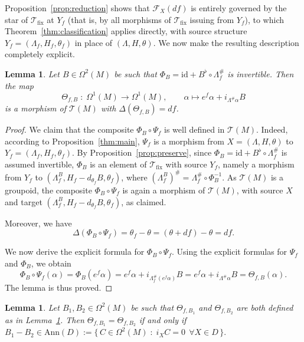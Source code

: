 \documentclass[11pt,a4paper]{article}
\theoremstyle{plain}
\newtheorem{lemma}[theorem]{Lemma}
\theoremstyle{definition}
\theoremstyle{remark}
\begin{document}
Proposition~\ref{prop:reduction} shows that $\mathcal{F}_X(df)$ is entirely governed by the star of $\mathcal{T}_{\mathrm{fix}}$ at $Y_f$ (that is, by all morphisms of $\mathcal{T}_{\mathrm{fix}}$ issuing from $Y_f$), to which Theorem~\ref{thm:classification} applies directly, with source structure $Y_f = (\Lambda_f, H_f, \theta_f)$ in place of $(\Lambda, H, \theta)$. We now make the resulting description completely explicit.

\begin{lemma}\label{prop:conformal-gauge}
	Let $B \in \Omega^2(M)$ be such that $\Phi_B = \mathrm{id} + B^{\flat} \circ \Lambda_f^{\#}$ is invertible. Then the map
	$$
	\Theta_{f,B} \;:\; \Omega^1(M) \longrightarrow \Omega^1(M), \qquad \alpha \longmapsto e^f \alpha + i_{\Lambda^{\#}\alpha} B
	$$
	is a morphism of $\mathcal{T}(M)$ with $\Delta(\Theta_{f,B}) = df$.
\end{lemma}

\begin{proof}
	We claim that the composite $\Phi_B \circ \Psi_f$ is well defined in $\mathcal{T}(M)$. Indeed, according to Proposition~\ref{thm:main}, $\Psi_f$ is a morphism from $X = (\Lambda, H, \theta)$ to $Y_f = (\Lambda_f, H_f, \theta_f)$. By Proposition~\ref{prop:preserve}, since $\Phi_B = \mathrm{id} + B^{\flat} \circ \Lambda_f^{\#}$ is assumed invertible, $\Phi_B$ is an element of $\mathcal{T}_{\mathrm{fix}}$ with source $Y_f$, namely a morphism from $Y_f$ to $(\Lambda_f^B, H_f - d_{\theta_f} B, \theta_f)$, where $(\Lambda_f^B)^{\#} = \Lambda_f^{\#} \circ \Phi_B^{-1}$. As $\mathcal{T}(M)$ is a groupoid, the composite $\Phi_B \circ \Psi_f$ is again a morphism of $\mathcal{T}(M)$, with source $X$ and target $(\Lambda_f^B, H_f - d_{\theta_f} B, \theta_f)$, as claimed.
	
	Moreover, we have
	$$
	\Delta(\Phi_B \circ \Psi_f) = \theta_f - \theta = (\theta + df) - \theta = df.
	$$
	
	We now derive the explicit formula for $\Phi_B \circ \Psi_f$. Using the explicit formulas for $\Psi_f$ and $\Phi_B$, we obtain
	$$
	\Phi_B \circ \Psi_f(\alpha) = \Phi_B(e^f \alpha) = e^f \alpha + i_{\Lambda_f^{\#}(e^f \alpha)} B = e^f \alpha + i_{\Lambda^{\#}\alpha} B = \Theta_{f,B}(\alpha).
	$$
	The lemma is thus proved.
\end{proof}

\begin{lemma}\label{lem:B-equiv}
	Let $B_1, B_2 \in \Omega^2(M)$ be such that $\Theta_{f,B_1}$ and $\Theta_{f,B_2}$ are both defined as in Lemma~\ref{prop:conformal-gauge}. Then
	$\Theta_{f,B_1} = \Theta_{f,B_2}$ if and only if
	$B_1 - B_2 \in \mathrm{Ann}(D) := \bigl\{\, C \in \Omega^2(M) \;:\; i_X C = 0 \ \ \forall X \in D \,\bigr\}.$
\end{lemma}
\end{document}
